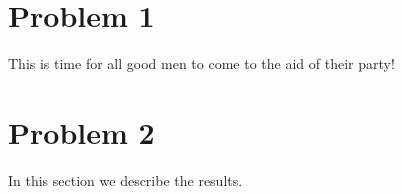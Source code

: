 \documentclass[12pt]{article}
\begin{document}
\maketitle

\section*{Problem 1}\label{Problem 1}
This is time for all good men to come to the aid of their party!

\section*{Problem 2}\label{Problem 2}
In this section we describe the results.
\end{document}
